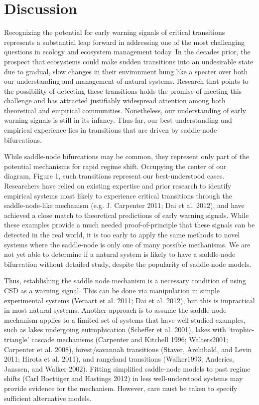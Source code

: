 \documentclass[author-year, review]{elsarticle} %
\begin{document}
\section{Discussion}

Recognizing the potential for early warning signals of critical
transitions represents a substantial leap forward in addressing one of
the most challenging questions in ecology and ecosystem management
today. In the decades prior, the prospect that ecosystems could make
sudden transitions into an undesirable state due to gradual, slow
changes in their environment hung like a specter over both our
understanding and management of natural systems. Research that points to
the possibility of detecting these transitions holds the promise of
meeting this challenge and has attracted justifiably widespread
attention among both theoretical and empirical communities. Nonetheless,
our understanding of early warning signals is still in its infancy. Thus
far, our best understanding and empirical experience lies in transitions
that are driven by saddle-node bifurcations.

While saddle-node bifurcations may be common, they represent only part
of the potential mechanisms for rapid regime shift. Occupying the center
of our diagram, Figure 1, such transitions represent our best-understood
cases. Researchers have relied on existing expertise and prior research
to identify empirical systems most likely to experience critical
transitions through the saddle-node-like mechanism (e.g. J. Carpenter
2011; Dai et al. 2012), and have achieved a close match to theoretical
predictions of early warning signals. While these examples provide a
much needed proof-of-principle that these signals can be detected in the
real world, it is too early to apply the same methods to novel systems
where the saddle-node is only one of many possible mechanisms. We are
not yet able to determine if a natural system is likely to have a
saddle-node bifurcation without detailed study, despite the popularity
of saddle-node models.

Thus, establishing the saddle node mechanism is a necessary condition of
using CSD as a warning signal. This can be done via manipulation in
simple experimental systems (Veraart et al. 2011; Dai et al. 2012), but
this is impractical in most natural systems. Another approach is to
assume the saddle-node mechanism applies to a limited set of systems
that have well-studied examples, such as lakes undergoing eutrophication
(Scheffer et al. 2001), lakes with `trophic-triangle' cascade mechanisms
(Carpenter and Kitchell 1996; Walters2001; Carpenter et al. 2008),
forest/savannah transitions (Staver, Archibald, and Levin 2011; Hirota
et al. 2011), and rangeland transitions (Walker1993; Anderies, Janssen,
and Walker 2002). Fitting simplified saddle-node models to past regime
shifts (Carl Boettiger and Hastings 2012) in less well-understood
systems may provide evidence for the mechanism. However, care must be
taken to specify sufficient alternative models.
\end{document}
